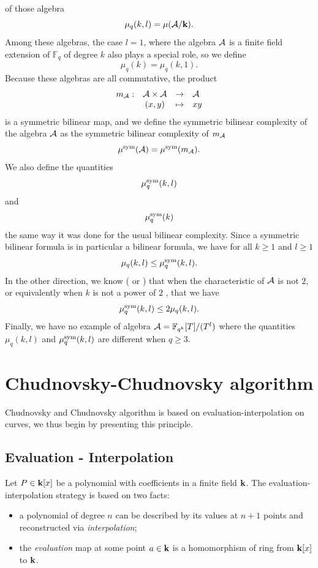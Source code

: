 of those algebra
\[
  \mu_q(k, l) = \mu(\mathcal{A}/\mathbf{k}).
\]
Among these algebras, the case $l=1$, where the algebra $\mathcal{A}$ is a finite field
extension of $\mathbb{F}_q$ of degree $k$ also plays a special role, so we
define 
\[
  \mu_q(k) = \mu_q(k, 1).
\]
Because these algebras are all commutative, the product 
\[
\begin{array}{lccl}
  m_{\mathcal{A}}:&\mathcal{A}\times \mathcal{A}&\to&\mathcal{A}\\
  &(x, y)&\mapsto&xy
\end{array}
\]
is a symmetric bilinear map, and we define the symmetric bilinear complexity of
the algebra $\mathcal{A}$ as the symmetric bilinear complexity of $m_{\mathcal{A}}$
\[
  \mu^{\textrm{sym}}(\mathcal{A}) = \mu^{\textrm{sym}}(m_{\mathcal{A}}).
\]
We also define the quantities
\[
  \mu^{\textrm{sym}}_q(k, l)
\]
and 
\[
  \mu^{\textrm{sym}}_q(k)
\]
the same way it was done for the usual bilinear complexity. Since a symmetric
bilinear formula is in particular a bilinear formula, we have for all $k\geq1$
and $l\geq1$
\[
  \mu_q(k, l)\leq\mu^{\textrm{sym}}_q(k, l).
\]
In the other direction, we know (\cite[Theorem $1$]{SL84} or \cite[Lemma
$1.6$]{Randriam12}) that when the characteristic of $\mathcal{A}$ is not $2$,
or equivalently when $k$ is not a power of $2$ , that we have
\[
  \mu^{\textrm{sym}}_q(k, l)\leq2\mu_q(k, l).
\]
Finally, we have no example of algebra $\mathcal{A} = \mathbb{F}_{q^k}[T]/(T^l)$ where the
quantities $\mu_q(k, l)$ and $\mu^{\textrm{sym}}_q(k, l)$ are different when $q\geq3$.

\section{Chudnovsky-Chudnovsky algorithm}
Chudnovsky and Chudnovsky algorithm is based on evaluation-interpolation on
curves, we thus begin by presenting this principle.
\subsection{Evaluation - Interpolation}
\label{sec:evalinter}

Let $P\in\mathbf{k}[x]$ be a polynomial with coefficients in a finite field $\mathbf{k}$. The
evaluation-interpolation strategy is based on two facts:
\begin{itemize}
  \item a polynomial of degree $n$ can be described by its values at $n+1$
    points and reconstructed via \emph{interpolation};
  \item the \emph{evaluation} map at some point $a\in\mathbf{k}$ is a homomorphism of ring from
    $\mathbf{k}[x]$ to $\mathbf{k}$.
\end{itemize}
